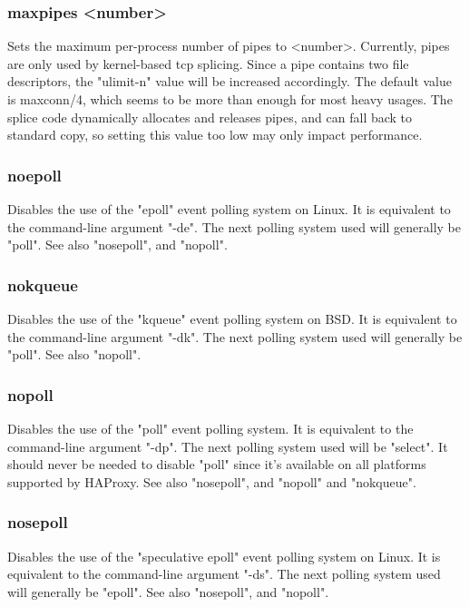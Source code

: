 \subsubsection[maxpipes]{maxpipes <number>}
  Sets the maximum per-process number of pipes to <number>. Currently, pipes
  are only used by kernel-based tcp splicing. Since a pipe contains two file
  descriptors, the "ulimit-n" value will be increased accordingly. The default
  value is maxconn/4, which seems to be more than enough for most heavy usages.
  The splice code dynamically allocates and releases pipes, and can fall back
  to standard copy, so setting this value too low may only impact performance.

\subsubsection[noepoll]{noepoll}
  Disables the use of the "epoll" event polling system on Linux. It is
  equivalent to the command-line argument "-de". The next polling system
  used will generally be "poll". See also "nosepoll", and "nopoll".

\subsubsection[nokqueue]{nokqueue}
  Disables the use of the "kqueue" event polling system on BSD. It is
  equivalent to the command-line argument "-dk". The next polling system
  used will generally be "poll". See also "nopoll".

\subsubsection[nopoll]{nopoll}
  Disables the use of the "poll" event polling system. It is equivalent to the
  command-line argument "-dp". The next polling system used will be "select".
  It should never be needed to disable "poll" since it's available on all
  platforms supported by HAProxy. See also "nosepoll", and "nopoll" and
  "nokqueue".

\subsubsection[nosepoll]{nosepoll}
  Disables the use of the "speculative epoll" event polling system on Linux. It
  is equivalent to the command-line argument "-ds". The next polling system
  used will generally be "epoll". See also "nosepoll", and "nopoll".

